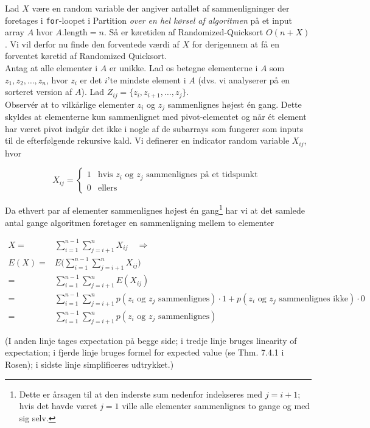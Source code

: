 \documentclass[12pt]{article}
\begin{document}
Lad $X$ være en random variable der angiver antallet af sammenligninger der foretages i \texttt{for}-loopet i Partition \textit{over en hel kørsel af algoritmen} på et input array $A$ hvor $A.\text{length}=n$. Så er køretiden af Randomized-Quicksort $O(n+X)$. Vi vil derfor nu finde den forventede værdi af $X$ for derigennem at få en forventet køretid af Randomized Quicksort. \\

Antag at alle elementer i $A$ er unikke. Lad os betegne elementerne i $A$ som $z_1, z_2, \ldots, z_n$, hvor $z_i$ er det $i$'te mindste element i $A$ (dvs. vi analyserer på en sorteret version af $A$). Lad $Z_{ij}=\{z_i, z_{i+1},\ldots, z_j\}$. \\

Observér at to vilkårlige elementer $z_i$ og $z_j$ sammenlignes højest én gang. Dette skyldes at elementerne kun sammenlignet med pivot-elementet og når ét element har været pivot indgår det ikke i nogle af de subarrays som fungerer som inputs til de efterfølgende rekursive kald. Vi definerer en indicator random variable $X_{ij}$, hvor

\[ X_{ij} = \left\{ \begin{array}{ll}
        1 & \mbox{hvis $z_i$ og $z_j$ sammenlignes på et tidspunkt }\\
        0 & \mbox{ellers}\end{array} \right. \] 

Da ethvert par af elementer sammenlignes højest én gang\footnote{Dette er årsagen til at den inderste sum nedenfor indekseres med $j=i+1$; hvis det havde været $j=1$ ville alle elementer sammenlignes to gange og med sig selv.} har vi at det samlede antal gange algoritmen foretager en sammenligning mellem to elementer  

\begin{align*}
    X =& \sum_{i=1}^{n-1} \sum_{j=i+1}^n X_{ij} \quad \Rightarrow \\
    E(X) =& E\bigg(  \sum_{i=1}^{n-1} \sum_{j=i+1}^n X_{ij}\bigg) &&  \\
    =& \sum_{i=1}^{n-1} \sum_{j=i+1}^n E(X_{ij}) &&  \\
    =& \sum_{i=1}^{n-1} \sum_{j=i+1}^n p(z_i \text{ og } z_j \text{ sammenlignes}) \cdot 1 + p(z_i \text{ og } z_j \text{ sammenlignes ikke}) \cdot 0 \\
    =& \sum_{i=1}^{n-1} \sum_{j=i+1}^n p(z_i \text{ og } z_j \text{ sammenlignes}) 
\end{align*}

(I anden linje tages expectation på begge side; i tredje linje bruges linearity of expectation; i fjerde linje bruges formel for expected value (se Thm. 7.4.1 i Rosen); i sidste linje simplificeres udtrykket.) \\
\end{document}

